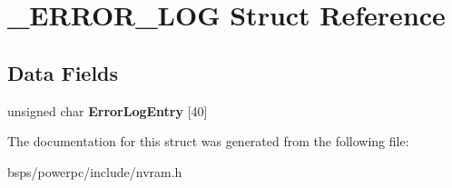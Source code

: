 \hypertarget{struct__ERROR__LOG}{}\section{\+\_\+\+E\+R\+R\+O\+R\+\_\+\+L\+OG Struct Reference}
\label{struct__ERROR__LOG}
\subsection*{Data Fields}
\begin{DoxyCompactItemize}
\item 
\mbox{\label{struct__ERROR__LOG_a0b64055df81bc9bf2134c921b1d61a72}} 
unsigned char {\bfseries Error\+Log\+Entry} \mbox{[}40\mbox{]}
\end{DoxyCompactItemize}


The documentation for this struct was generated from the following file\+:\begin{DoxyCompactItemize}
\item 
bsps/powerpc/include/nvram.\+h\end{DoxyCompactItemize}
